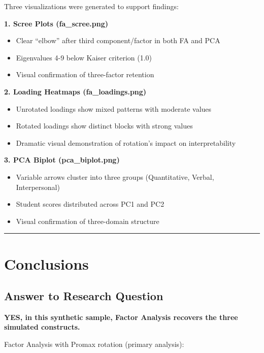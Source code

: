 \documentclass[
]{article}
\begin{document}
Three visualizations were generated to support findings:

\textbf{1. Scree Plots (fa\_scree.png)}

\begin{itemize}
\item
  Clear ``elbow'' after third component/factor in both FA and PCA
\item
  Eigenvalues 4-9 below Kaiser criterion (1.0)
\item
  Visual confirmation of three-factor retention
\end{itemize}

\textbf{2. Loading Heatmaps (fa\_loadings.png)}

\begin{itemize}
\item
  Unrotated loadings show mixed patterns with moderate values
\item
  Rotated loadings show distinct blocks with strong values
\item
  Dramatic visual demonstration of rotation's impact on interpretability
\end{itemize}

\textbf{3. PCA Biplot (pca\_biplot.png)}

\begin{itemize}
\item
  Variable arrows cluster into three groups (Quantitative, Verbal,
  Interpersonal)
\item
  Student scores distributed across PC1 and PC2
\item
  Visual confirmation of three-domain structure
\end{itemize}

\begin{center}\rule{0.5\linewidth}{0.5pt}\end{center}

\section{Conclusions}

\subsection{Answer to Research Question}

\textbf{YES, in this synthetic sample, Factor Analysis recovers the
three simulated constructs.}

Factor Analysis with Promax rotation (primary analysis):
\end{document}
